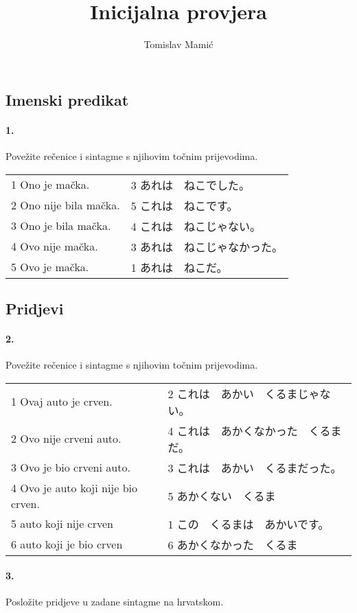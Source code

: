 \documentclass[12pt]{article}
\author{Tomislav Mamić}
\title{Inicijalna provjera}
\begin{document}
	\subsection{Imenski predikat}
	
	\paragraph{1.} Povežite rečenice i sintagme s njihovim točnim prijevodima.
	
	\begin{tabularx}{\textwidth}{X X}
		1 Ono je mačka.&3 あれは　ねこでした。\\
		2 Ono nije bila mačka.&5 これは　ねこです。\\
		3 Ono je bila mačka.&4 これは　ねこじゃない。\\
		4 Ovo nije mačka.&3 あれは　ねこじゃなかった。\\
		5 Ovo je mačka.&1 あれは　ねこだ。\\
	\end{tabularx}

	\subsection{Pridjevi}

	\paragraph{2.} Povežite rečenice i sintagme s njihovim točnim prijevodima.
	
	\begin{tabularx}{\textwidth}{X X}
		1 Ovaj auto je crven.&2 これは　あかい　くるまじゃない。\\
		2 Ovo nije crveni auto.&4 これは　あかくなかった　くるまだ。\\
		3 Ovo je bio crveni auto.&3 これは　あかい　くるまだった。\\
		4 Ovo je auto koji nije bio crven.&5 あかくない　くるま\\
		5 auto koji nije crven&1 この　くるまは　あかいです。\\
		6 auto koji je bio crven&6 あかくなかった　くるま\\
	\end{tabularx}

	\paragraph{3.} Posložite pridjeve u zadane sintagme na hrvatskom.
	
\end{document}
